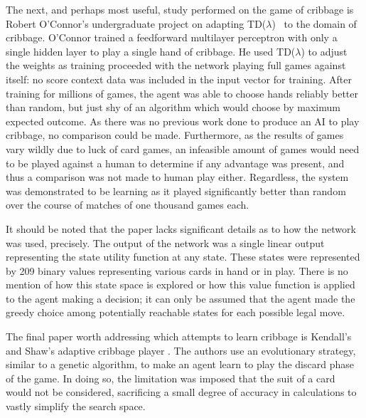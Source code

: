 The next,
and perhaps most useful,
study performed on the game of cribbage is Robert O'Connor's undergraduate
project
\cite{roconnor_cs486}
on adapting TD($\lambda$)~\cite{tdgammon} to the domain of cribbage.
%
O'Connor trained a feedforward multilayer perceptron with only a single hidden
layer to play a single hand of cribbage.
%
He used TD($\lambda$) to adjust the weights as training proceeded with the
network playing full games against itself:
no score context data was included in the input vector for training.
%
After training for millions of games,
the agent was able to choose hands reliably better than random,
but just shy of an algorithm which would choose by maximum expected outcome.
%
As there was no previous work done to produce an AI to play cribbage,
no comparison could be made.
%
Furthermore,
as the results of games vary wildly due to luck of card games,
an infeasible amount of games would need to be played against a human to
determine if any advantage was present,
and thus a comparison was not made to human play either.
%
Regardless,
the system was demonstrated to be learning as it played significantly
better than random over the course of matches of one thousand games each.

It should be noted that the paper lacks significant details
as to how the network was used, precisely.
%
The output of the network was a single linear output representing the state
utility function at any state.
%
These states were represented by 209 binary values representing various cards in
hand or in play.
%
There is no mention of how this state space is explored or how this value
function is applied to the agent making a decision;
it can only be assumed that the agent made the greedy choice among potentially
reachable states for each possible legal move.

The final paper worth addressing which attempts to learn cribbage
is Kendall's and Shaw's adaptive cribbage player
\cite{adaptive_cribbage}.
%
The authors use an evolutionary strategy,
similar to a genetic algorithm,
to make an agent learn to play the discard phase of the game.
%
In doing so,
the limitation was imposed that the suit of a card would not be considered,
sacrificing a small degree of accuracy in calculations to vastly simplify the
search space.

